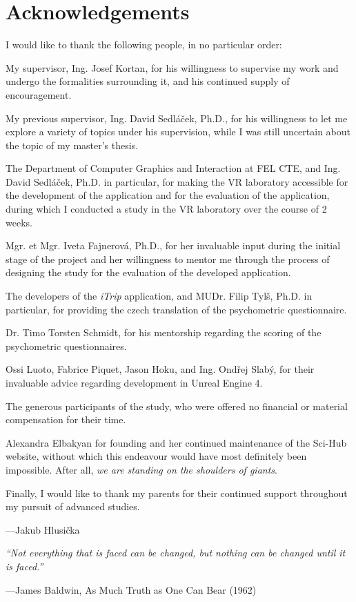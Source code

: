 \chapter*{Acknowledgements}
{
\small
I would like to thank the following people, in no particular order:

My supervisor, Ing. Josef Kortan, for his willingness to supervise my work and undergo the formalities surrounding it, and his continued supply of encouragement.

My previous supervisor, Ing. David Sedláček, Ph.D., for his willingness to let me explore a variety of topics under his supervision, while I was still uncertain about the topic of my master's thesis.

The Department of Computer Graphics and Interaction at FEL CTE, and Ing. David Sedláček, Ph.D. in particular, for making the VR laboratory accessible for the development of the application and for the evaluation of the application, during which I conducted a study in the VR laboratory over the course of 2 weeks.

Mgr. et Mgr. Iveta Fajnerová, Ph.D., for her invaluable input during the initial stage of the project and her willingness to mentor me through the process of designing the study for the evaluation of the developed application.

The developers of the \textit{iTrip} application, and MUDr. Filip Tylš, Ph.D. in particular, for providing the czech translation of the psychometric questionnaire.

Dr. Timo Torsten Schmidt, for his mentorship regarding the scoring of the psychometric questionnaires.

Ossi Luoto, Fabrice Piquet, Jason Hoku, and Ing. Ondřej Slabý, for their invaluable advice regarding development in Unreal Engine 4.

The generous participants of the study, who were offered no financial or material compensation for their time.

Alexandra Elbakyan for founding and her continued maintenance of the Sci-Hub website, without which this endeavour would have most definitely been impossible. After all, \textit{we are standing on the shoulders of giants}.

Finally, I would like to thank my parents for their continued support throughout my pursuit of advanced studies.
}

\begin{flushright}
---Jakub Hlusička
\end{flushright}

\vfill
\begin{center}
{\large
\textit{``Not everything that is faced can be changed, but nothing can be changed until it is faced.''}
}
\end{center}
\begin{flushright}
    ---James Baldwin, As Much Truth as One Can Bear (1962)
\end{flushright}
